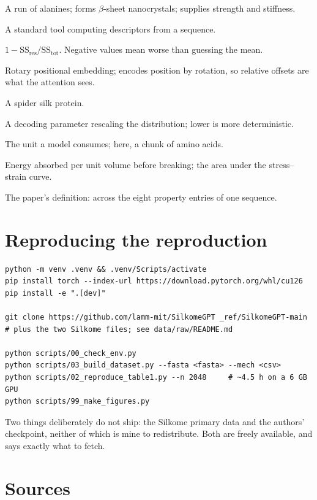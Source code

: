 \begin{description}[leftmargin=0cm,style=nextline,itemsep=3pt]
\item[Poly-A] A run of alanines; forms $\beta$-sheet nanocrystals; supplies
  strength and stiffness.
\item[ProtParam] A standard tool computing descriptors from a sequence.
\item[\Rsq] $1 - \mathrm{SS}_{\text{res}}/\mathrm{SS}_{\text{tot}}$. Negative
  values mean worse than guessing the mean.
\item[RoPE] Rotary positional embedding; encodes position by rotation, so
  relative offsets are what the attention sees.
\item[Spidroin] A spider silk protein.
\item[Temperature] A decoding parameter rescaling the distribution; lower is
  more deterministic.
\item[Token] The unit a model consumes; here, a chunk of amino acids.
\item[Toughness] Energy absorbed per unit volume before breaking; the area
  under the stress--strain curve.
\item[Within-vector \Rsq] The paper's definition: \Rsq{} across the eight
  property entries of one sequence.
\end{description}

\section{Reproducing the reproduction}

\begin{lstlisting}[style=plain]
python -m venv .venv && .venv/Scripts/activate
pip install torch --index-url https://download.pytorch.org/whl/cu126
pip install -e ".[dev]"

git clone https://github.com/lamm-mit/SilkomeGPT _ref/SilkomeGPT-main
# plus the two Silkome files; see data/raw/README.md

python scripts/00_check_env.py
python scripts/03_build_dataset.py --fasta <fasta> --mech <csv>
python scripts/02_reproduce_table1.py --n 2048     # ~4.5 h on a 6 GB GPU
python scripts/99_make_figures.py
\end{lstlisting}

Two things deliberately do not ship: the Silkome primary data and the authors'
checkpoint, neither of which is mine to redistribute. Both are freely
available, and  says exactly what to fetch.

\section*{Sources}

